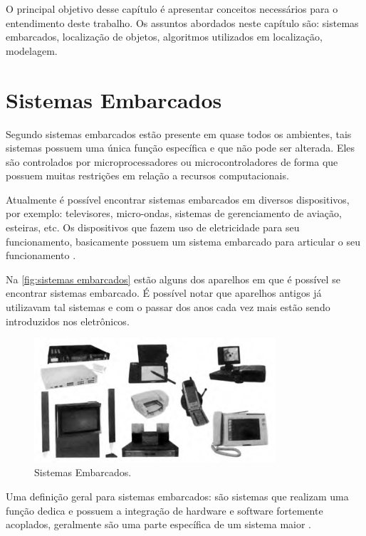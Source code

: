 \label{chapter:conceitos}
O principal objetivo desse capítulo é apresentar conceitos necessários para o entendimento deste trabalho. 
Os assuntos abordados neste capítulo são:  sistemas embarcados, localização de objetos, algoritmos utilizados
em localização, modelagem.%

\section{Sistemas Embarcados}

Segundo \citeauthor{rodrigo2016} sistemas embarcados estão presente em quase todos os ambientes, tais sistemas possuem uma única função específica e que não pode ser alterada. Eles são controlados por microprocessadores ou microcontroladores de forma que possuem muitas restrições em relação a recursos computacionais.

    \par
    Atualmente é possível encontrar sistemas embarcados em diversos dispositivos, por exemplo: televisores, micro-ondas, sistemas de gerenciamento de aviação, esteiras, etc. Os dispositivos que fazem uso de eletricidade para seu funcionamento, basicamente possuem um sistema embarcado para articular o seu funcionamento \cite{rodrigo2016}.
    
    \par
    Na \autoref{fig:sistemas embarcados} estão alguns dos aparelhos em que é possível se encontrar sistemas embarcado. É possível notar que aparelhos antigos já utilizavam tal sistemas e com o passar dos anos cada vez mais estão sendo introduzidos nos eletrônicos.
    \begin{figure}[h!]
              \caption{\label{fig:sistemas embarcados}{Sistemas Embarcados.}}
              \centering
              \includegraphics[width=0.8\textwidth]{Figuras/systems_embedded.PNG}
            \end{figure}
    \par
    Uma definição geral para sistemas embarcados: são sistemas que realizam uma função dedica e possuem a integração de hardware e software fortemente acoplados, geralmente são uma parte específica de um sistema maior \cite{Li:2003:RCE:829584}.
    
